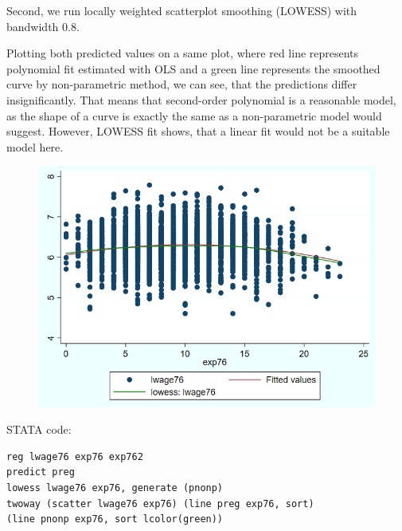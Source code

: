 \documentclass[12pt,a4paper, oneside]{extreport}
\begin{document}
Second, we run locally weighted scatterplot smoothing (LOWESS) with bandwidth 0.8. 

Plotting both predicted values on a same plot, where red line represents polynomial fit estimated with OLS and  a green line represents the smoothed curve by non-parametric method, we can see, that the predictions differ insignificantly. That means that second-order polynomial is a reasonable model, as the shape of a curve is exactly the same as a non-parametric model would suggest. However, LOWESS fit shows, that a linear fit would not be a suitable model here. 



\begin{figure}[H]
	\centering
	\includegraphics[width=0.7\linewidth]{screenshot004}
	\label{fig:screenshot001}
\end{figure}


STATA code:

\begin{verbatim}
reg lwage76 exp76 exp762
predict preg
lowess lwage76 exp76, generate (pnonp)
twoway (scatter lwage76 exp76) (line preg exp76, sort) 
(line pnonp exp76, sort lcolor(green))
\end{verbatim}
\end{document}

